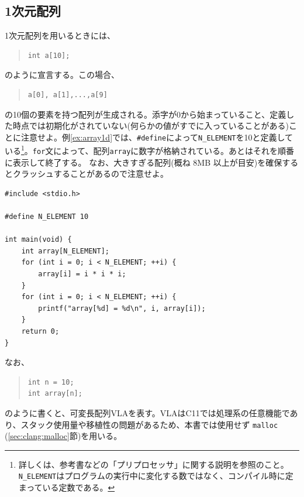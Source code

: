 \subsection{1次元配列}
1次元配列を用いるときには、
\begin{quote}
    \begin{verbatim}
int a[10];
\end{verbatim}
\end{quote}
のように宣言する。この場合、
\begin{quote}
    \begin{verbatim}
a[0], a[1],...,a[9]
\end{verbatim}
\end{quote}
の10個の要素を持つ配列が生成される。添字が0から始まっていること、定義した時点では初期化がされていない(何らかの値がすでに入っていることがある)ことに注意せよ。例\ref{ex:array1d}では、\texttt{\#define}によって\texttt{N\_ELEMENT}を10と定義している\footnote{詳しくは、参考書などの「プリプロセッサ」に関する説明を参照のこと。\texttt{N\_ELEMENT}はプログラムの実行中に変化する数ではなく、コンパイル時に定まっている定数である。}。\texttt{for}文によって、配列\texttt{array}に数字が格納されている。あとはそれを順番に表示して終了する。
なお、大きすぎる配列(概ね 8MB 以上が目安)を確保するとクラッシュすることがあるので注意せよ。

\begin{reidai}\label{ex:array1d}
    \begin{verbatim}
#include <stdio.h>

#define N_ELEMENT 10

int main(void) {
    int array[N_ELEMENT];
    for (int i = 0; i < N_ELEMENT; ++i) {
        array[i] = i * i * i;
    }
    for (int i = 0; i < N_ELEMENT; ++i) {
        printf("array[%d] = %d\n", i, array[i]);
    }
    return 0;
}
\end{verbatim}
\end{reidai}

なお、
\begin{quote}
    \begin{verbatim}
int n = 10;
int array[n];
\end{verbatim}
\end{quote}
のように書くと、可変長配列VLAを表す。VLAはC11では処理系の任意機能であり、スタック使用量や移植性の問題があるため、本書では使用せず \texttt{malloc} (\ref{sec:clang:malloc}節)を用いる。

